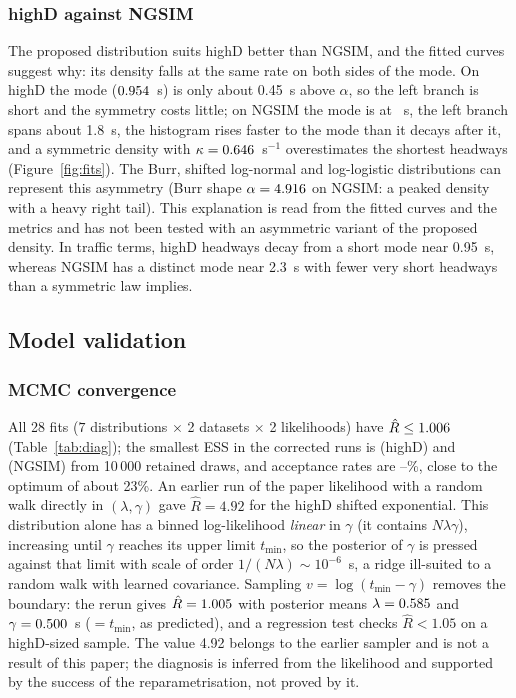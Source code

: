 \documentclass[10pt,a4paper]{article}
\numberwithin{equation}{section}
\begin{document}
\subsubsection{highD against NGSIM}\label{sec:disc}
The proposed distribution suits highD better than NGSIM, and the fitted curves suggest why: its density falls at the same rate on both sides of the mode. On highD the mode ($0.954$~s) is only about 0.45~s above $\alpha$, so the left branch is short and the symmetry costs little;
on NGSIM the mode is at \ngA~s, the left branch spans about 1.8~s, the histogram rises faster to the mode than it decays after it, and a symmetric density with $\kappa=0.646$~s$^{-1}$ overestimates the shortest headways (Figure~\ref{fig:fits}). The Burr, shifted log-normal and log-logistic distributions can represent this asymmetry (Burr shape $\alpha=4.916$ on NGSIM: a peaked density with a heavy right tail).
This explanation is read from the fitted curves and the metrics and has not been tested with an asymmetric variant of the proposed density. In traffic terms, highD headways decay from a short mode near 0.95~s, whereas NGSIM has a distinct mode near 2.3~s with fewer very short headways than a symmetric law implies.

\subsection{Model validation}\label{sec:valid}
\subsubsection{MCMC convergence}\label{sec:conv}
All 28 fits ($7$ distributions $\times$ 2 datasets $\times$ 2 likelihoods) have $\hat R\le1.006$ (Table~\ref{tab:diag}); the smallest ESS in the corrected runs is \hdEssMin{} (highD) and \ngEssMin{} (NGSIM) from 10\,000 retained draws, and acceptance rates are \ngAccMin--\ngAccMax\%, close to the optimum of about 23\%.
An earlier run of the paper likelihood with a random walk directly in $(\lambda,\gamma)$ gave $\hat R=4.92$ for the highD shifted exponential. This distribution alone has a binned log-likelihood \emph{linear} in $\gamma$ (it contains $N\lambda\gamma$), increasing until $\gamma$ reaches its upper limit $t_{\min}$, so the posterior of $\gamma$ is pressed against that limit with scale of order $1/(N\lambda)\sim10^{-6}$~s, a ridge ill-suited to a random walk with learned covariance.
Sampling $v=\log(t_{\min}-\gamma)$ removes the boundary: the rerun gives $\hat R=1.005$ with posterior means $\lambda=0.585$ and $\gamma=0.500$~s ($=t_{\min}$, as predicted), and a regression test checks $\hat R<1.05$ on a highD-sized sample. The value 4.92 belongs to the earlier sampler and is not a result of this paper; the diagnosis is inferred from the likelihood and supported by the success of the reparametrisation, not proved by it.
\end{document}
